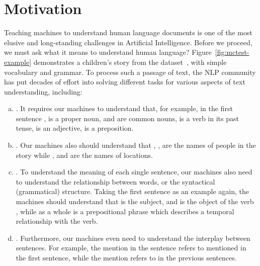 
\section{Motivation}

Teaching machines to understand human language documents is one of the most elusive and long-standing challenges in Artificial Intelligence. Before we proceed, we must ask what it means to understand human language? Figure~\ref{fig:mctest-example} demonstrates a children's story from the  dataset~\cite{richardson2013mctest}, with simple vocabulary and grammar. To process such a passage of text, the NLP community has put decades of effort into solving different tasks for various aspects of text understanding, including:
\begin{enumerate}[(a)]
    \item
        . It requires our machines to understand that, for example, in the first sentence ,  is a proper noun,  and  are common nouns,  is a verb in its past tense,  is an adjective,  is a preposition.
    \item
        . Our machines also should understand that , ,  are the names of people in the story while ,  and  are the names of locations.
    \item
        . To understand the meaning of each single sentence, our machines also need to understand the relationship between words, or the syntactical (grammatical) structure. Taking the first sentence  as an example again, the machines should understand that  is the subject, and  is the object of the verb , while  as a whole is a prepositional phrase which describes a temporal relationship with the verb.
    \item
        . Furthermore, our machines even need to understand the interplay between sentences. For example, the mention  in the sentence  refers to  mentioned in the first sentence, while the mention  refers to  in the previous sentences.
\end{enumerate}

